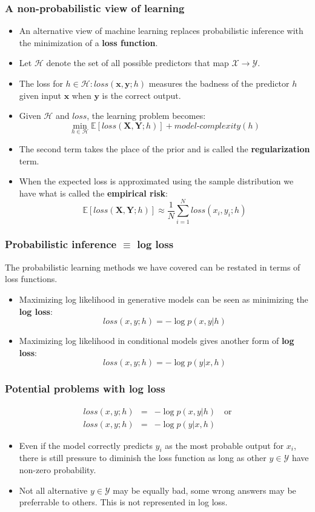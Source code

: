 \documentclass[ignorenonframetext,plain]{beamer}
\newcommand{\loss}{\mathit{loss}}
\begin{document}
\begin{frame}\frametitle{A non-probabilistic view of learning} %
\begin{itemize}
\item An alternative view of machine learning replaces probabilistic
inference with the minimization of a {\bf loss function}.  
\item Let $\mathcal{H}$ denote the set of all possible predictors that
  map $\mathcal{X}\rightarrow\mathcal{Y}$.  
\item The loss for $h\in\mathcal{H}: \loss(\mathbf{x}, \mathbf{y}; h)$
  measures the badness of the predictor $h$ given input $\mathbf{x}$
  when $\mathbf{y}$ is the correct output.
\item Given $\mathcal{H}$ and $\loss$, the learning problem becomes:\[
  \min_{h\in\mathcal{H}} \mathbb{E}[\loss(\mathbf{X}, \mathbf{Y}; h)]
  + \textit{model-complexity}(h)
\]
\item The second term takes the place of the prior and is called the
  {\bf regularization} term.
\item When the expected loss is approximated using the sample
  distribution we have what is called the {\bf empirical risk}:\[
  \mathbb{E}[\loss(\mathbf{X}, \mathbf{Y}; h)] \approx \frac{1}{N}
  \sum_{i=1}^N \loss(x_i, y_i; h)
\]
\end{itemize}
\end{frame}

\begin{frame}\frametitle{Probabilistic inference $\equiv$ log loss}
The probabilistic learning methods we have covered can be restated in
terms of loss functions.
\begin{itemize}
\item Maximizing log likelihood in generative models can be seen as
  minimizing the {\bf log loss}:\[
\loss(x, y; h) = -\log p(x, y | h)
\]
\item Maximizing log likelihood in conditional models gives another
  form of {\bf log loss}:\[
\loss(x, y; h) = -\log p(y | x, h)
\]
\end{itemize}
\end{frame}
\begin{frame}\frametitle{Potential problems with log loss}
\begin{eqnarray*}
\loss(x, y; h) &=& -\log p(x, y | h)\quad\text{or}\\
\loss(x, y; h) &=& -\log p(y | x, h)
\end{eqnarray*}
\begin{itemize}
\item Even if the model correctly predicts $y_i$ as the most probable
  output for $x_i$, there is still pressure to diminish the loss
  function as long as other $y\in\mathcal{Y}$ have non-zero
  probability.
\item Not all alternative $y\in\mathcal{Y}$ may be equally bad, some
  wrong answers may be preferrable to others.  This is not represented
  in log loss.
\end{itemize}
\end{frame}
\end{document}
